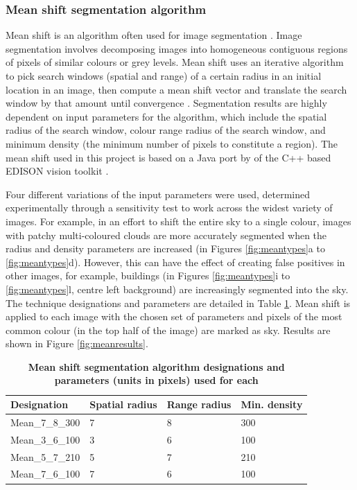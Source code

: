 \documentclass[final,3p,times,authoryear]{elsarticle}
\begin{document}
\subsubsection{Mean shift segmentation algorithm}\label{sec:mean}

Mean shift is an algorithm often used for image segmentation \citep{Comaniciu1997,Comaniciu2002}. Image segmentation involves decomposing images into homogeneous contiguous regions of pixels of similar colours or grey levels. Mean shift uses an iterative algorithm to pick search windows (spatial and range) of a certain radius in an initial location in an image, then compute a mean shift vector and translate the search window by that amount until convergence \citep{Comaniciu1997}. Segmentation results are highly dependent on input parameters for the algorithm, which include the spatial radius of the search window, colour range radius of the search window, and minimum density (the minimum number of pixels to constitute a region). The mean shift used in this project is based on a Java port by \cite{Pangburn2002} of the C++ based EDISON vision toolkit \citep{Christoudias2002}. 

Four different variations of the input parameters were used, determined experimentally through a sensitivity test to work across the widest variety of images. For example, in an effort to shift the entire sky to a single colour, images with patchy multi-coloured clouds are more accurately segmented when the radius and density parameters are increased (in Figures \ref{fig:meantypes}a to \ref{fig:meantypes}d). However, this can have the effect of creating false positives in other images, for example, buildings (in Figures \ref{fig:meantypes}i to \ref{fig:meantypes}l, centre left background) are increasingly segmented into the sky. The technique designations and parameters are detailed in Table \ref{tab:techniques2}. Mean shift is applied to each image with the chosen set of parameters and pixels of the most common colour (in the top half of the image) are marked as sky. Results are shown in Figure \ref{fig:meanresults}.


\begin{table}[!htbp]
\caption{\bf Mean shift segmentation algorithm designations and parameters (units in pixels) used for each \label{tab:techniques2}}     
\begin{tabular}{ l l l l}
\textbf{Designation}  & \textbf{Spatial radius}&\textbf{Range radius}&\textbf{Min. density}   \\ \hline
Mean\_7\_8\_300 & 7& 8& 300 \\
Mean\_3\_6\_100	& 3& 6& 100 \\
Mean\_5\_7\_210	& 5& 7& 210 \\	 
Mean\_7\_6\_100	& 7& 6& 100 \\

\hline
\end{tabular}
\end{table}
\end{document}
